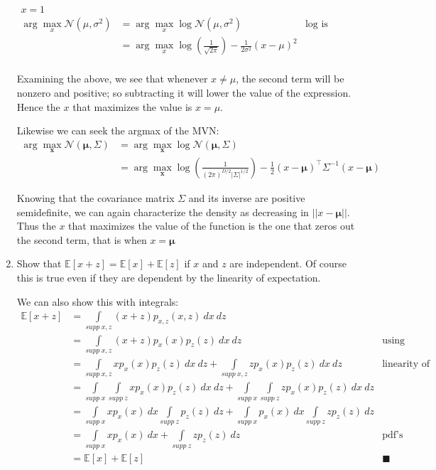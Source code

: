 \documentclass[../main.tex]{subfiles}
\begin{document}
\begin{enumerate}
\begin{align*}
	x = 1&&\\
	\arg \max_x \mathcal{N}(\mu, \sigma^2) &= \arg \max_x \log \mathcal{N}(\mu, \sigma^2) &\text{log is order-preserving}\\
	&= \arg \max_x \log\left(\frac{1}{\sqrt{2\pi}}\right) - \frac{1}{2\sigma^2}(x-\mu)^2 &\\
\end{align*}

Examining the above, we see that whenever $x \neq \mu$, the second term will be nonzero and positive; so subtracting it will lower the value of the expression. Hence the $x$ that maximizes the value is $x = \mu$. 

Likewise we can seek the argmax of the MVN:
\begin{align*}
	\arg \max_{\mathbf{x}} \mathcal{N}(\mathbf{\mu}, \Sigma) &= \arg \max_{\mathbf{x}} \log \mathcal{N}(\mathbf{\mu}, \Sigma) &\\
	&= \arg \max_{\mathbf{x}} \log\left(\frac{1}{(2\pi)^{D/2}|\Sigma|^{1/2}}\right) - \frac{1}{2}(x-\mathbf{\mu})^\top \Sigma^{-1}(x-\mathbf{\mu})
\end{align*}

Knowing that the covariance matrix $\Sigma$ and its inverse are positive semidefinite, we can again characterize the density as decreasing in $||x - \mathbf{\mu}||$. Thus the $x$ that maximizes the value of the function is the one that zeros out the second term, that is when $x = \mathbf{\mu}$

\item Show that $\mathbb{E}[x + z] = \mathbb{E}[x] + \mathbb{E}[z]$ if $x$ and $z$ are independent. Of course this is true even if they are dependent by the linearity of expectation. 

We can also show this with integrals:
\begin{align*}	\mathbb{E}[x + z] &= \int\limits_{supp \ x,z}(x + z)p_{x, z}(x, z) \ dx \ dz &\\
&=\int\limits_{supp \ x, z} (x + z)p_x(x)p_z(z) \ dx \ dz &\text{using independence}\\
&=\int\limits_{supp \ x, z} x p_x(x)p_z(z) \ dx \ dz + \int\limits_{supp \ x, z}z p_x(x)p_z(z) \ dx \ dz &\text{linearity of integral}\\
&= \int\limits_{supp \ x} \int\limits_{supp \ z} xp_x(x)p_z(z) \ dx \ dz + \int\limits_{supp \ x} \int\limits_{supp \ z} z p_x(x) p_z(z)\ dx \ dz &\\
&= \int\limits_{supp \ x} x p_x(x) \ dx \int\limits_{supp \ z} p_z(z) \ dz + \int\limits_{supp \ x} p_x(x) \ dx \int\limits_{supp \ z} z p_z(z) \ dz &\\
&= \int\limits_{supp \ x} x p_x(x) \ dx + \int\limits_{supp \ z} z p_z(z) \ dz &\text{pdf's integrate to 1}\\
&= \mathbb{E}[x] + \mathbb{E}[z] & \blacksquare
\end{align*}


\end{enumerate}
\end{document}

